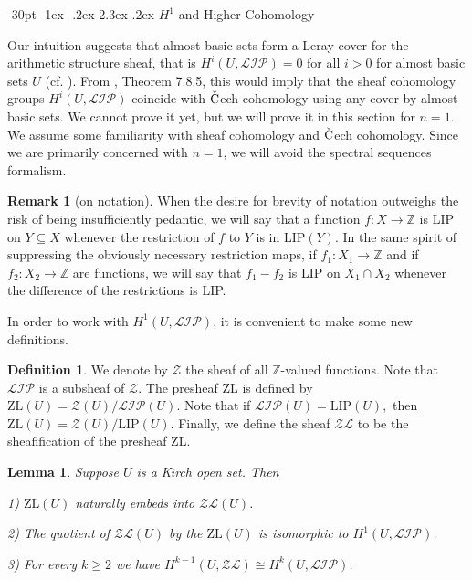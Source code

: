\documentclass[10pt]{article}
\makeatletter
\renewcommand\section{\@startsection {section}{1}{\z@}
{-30pt \@plus -1ex \@minus -.2ex}
{2.3ex \@plus.2ex}
{\normalfont\normalsize\bfseries\boldmath}}
\newtheorem{lemma}[theorem]{Lemma}
\theoremstyle{definition}
\newtheorem{definition}{Definition}
\newtheorem{remark}{Remark}
\makeatother
\begin{document}
\section{$H^1$ and  Higher Cohomology}%

Our intuition suggests that almost basic sets form a Leray cover for the arithmetic structure sheaf, that is $H^i(U,\mathcal {LIP})=0$ for all $i>0$ for almost basic sets $U$ (cf. \cite{Taylor}). From \cite{Taylor}, Theorem 7.8.5, this would imply that the sheaf cohomology groups $H^i(U,\mathcal {LIP})$ coincide with $\check{\textrm C}$ech cohomology using any cover by almost basic sets. We cannot prove it yet, but we will prove it in this section for $n=1$. We assume some familiarity with sheaf cohomology and $\check{\textrm C}$ech cohomology. Since we are primarily concerned with $n=1$, we will avoid the spectral sequences formalism.

\begin{remark}[on notation] When the desire for brevity of notation outweighs the risk of being insufficiently pedantic, we will say that a function $f: X \to \mathbb Z$ is LIP on $Y\subseteq X$ whenever the restriction of $f$ to $Y$ is in $\textrm{LIP}(Y).$ In the same spirit of suppressing the obviously necessary restriction maps, if $f_1: X_1 \to \mathbb Z$ and if $f_2: X_2 \to \mathbb Z$ are functions, we will say that $f_1-f_2$ is LIP on $X_1\cap X_2$ whenever the difference of the restrictions is LIP.
\end{remark}

In order to work with $H^1(U,\mathcal {LIP})$, it is convenient to make some new definitions.

\begin{definition} We denote by ${\mathcal Z}$ the sheaf of all  $\mathbb Z$-valued functions.  Note that $\mathcal{LIP}$ is a subsheaf of ${\mathcal Z}$. The presheaf $\textrm{ZL}$ is defined by $\textrm{ZL}(U)=\mathcal{Z}(U)/\mathcal{LIP}(U).$ Note that if $\mathcal{LIP}(U)=\textrm{LIP}(U),$ then $\textrm{ZL}(U)=\mathcal{Z}(U)/\textrm{LIP}(U).$  Finally, we define the sheaf $\mathcal{ZL}$ to be the sheafification of the presheaf $\textrm{ZL}.$ 
\end{definition}

\begin{lemma} \label{longexact} Suppose $U$ is a Kirch open set. Then

1) $\textrm{ZL}(U)$ naturally embeds into  $\mathcal{ZL}(U)$.

2) The quotient of $\mathcal{ZL}(U)$ by the $\textrm{ZL}(U)$ is isomorphic to $H^1(U,\mathcal {LIP})$.

3) For every $k\geq 2$ we have  $H^{k-1}(U,\mathcal {ZL}) \cong H^k(U,\mathcal {LIP})$.
\end{lemma}
\end{document}
